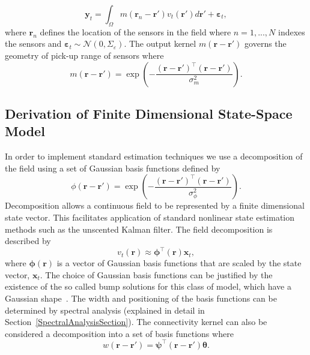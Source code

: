 \documentclass[12pt]{iopart}
\begin{document}
\begin{equation}
	\mathbf{y}_t = \int_{\Omega}{m\left(\mathbf{r}_n-\mathbf{r}'\right)v_t\left(\mathbf{r}'\right)d\mathbf{r}'} + \boldsymbol{\varepsilon}_t, 
\end{equation}
where $\mathbf{r}_n$ defines the location of the sensors in the field where $n=1,...,N$ indexes the sensors and $\boldsymbol{\varepsilon}_t \sim \mathcal{N}\left(0,\Sigma_{\varepsilon}\right)$. The output kernel $m(\mathbf{r}-\mathbf{r}')$ governs the geometry of pick-up range of sensors where 
\begin{equation}
	m\left(\mathbf{r}-\mathbf{r}'\right) = \exp{\left(-\frac{(\mathbf{r}-\mathbf{r}')^\top(\mathbf{r}-\mathbf{r}')}{\sigma_m^2}\right)}. 
\end{equation}

\subsection{Derivation of Finite Dimensional State-Space Model} 
In order to implement standard estimation techniques we use a decomposition of the field using a set of Gaussian basis functions defined by
\begin{equation}\label{eq:FieldBasisFunction}
	\phi\left(\mathbf{r}-\mathbf{r}'\right) =
\exp{\left(-\frac{(\mathbf{r}-\mathbf{r}')^\top(\mathbf{r}-\mathbf{r}')}{\sigma_{\phi}^2}\right)}. 
\end{equation}
 Decomposition allows a continuous field to be represented by a finite dimensional state vector. This facilitates application of standard nonlinear state estimation methods such as the unscented Kalman filter. The field decomposition is described by 
\begin{equation}
	\label{DefFieldDecomp} v_t\left(\mathbf{r}\right) \approx \boldsymbol{\phi}^{\top}\left(\mathbf{r}\right) \mathbf{x}_t, 
\end{equation}
where $\mathbf{\boldsymbol{\phi}}(\mathbf{r})$ is a vector of Gaussian basis functions that are scaled by the state vector, $\mathbf{x}_t$. The choice of Gaussian basis functions can be justified by the existence of the so called bump solutions for this class of model, which have a Gaussian shape~\cite{Coombes2005}. The width and positioning of the basis functions can be determined by spectral analysis (explained in detail in Section~\ref{SpectralAnalysisSection}). The connectivity kernel can also be considered a decomposition into a set of basis functions where 
\begin{equation}\label{DefKernelDecomp}
	 w\left(\mathbf{r}-\mathbf{r}'\right) =\boldsymbol{\psi}^\top\left(\mathbf{r}-\mathbf{r}'\right) \boldsymbol{\theta}.
\end{equation}
\end{document}
